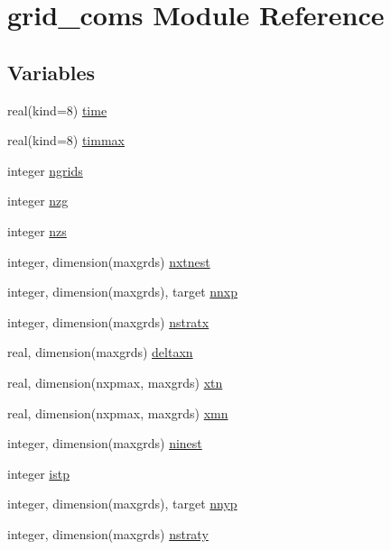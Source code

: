 \hypertarget{namespacegrid__coms}{}\section{grid\+\_\+coms Module Reference}
\label{namespacegrid__coms}
\subsection*{Variables}
\begin{DoxyCompactItemize}
\item 
real(kind=8) \hyperlink{namespacegrid__coms_a620c7c9f9699aec60464ae63865bd8bc}{time}
\item 
real(kind=8) \hyperlink{namespacegrid__coms_a0d5d3c6d496f754a977e81e980b57006}{timmax}
\item 
integer \hyperlink{namespacegrid__coms_ae4989ce85dc7d8d012ce238bcdc5946d}{ngrids}
\item 
integer \hyperlink{namespacegrid__coms_a142d9d74c03f8fa05eda4634bfbe0b83}{nzg}
\item 
integer \hyperlink{namespacegrid__coms_a760d4b670328e4c3a0a7accfdac64c19}{nzs}
\item 
integer, dimension(maxgrds) \hyperlink{namespacegrid__coms_a3a74d4b8ff65bb4d8f8eb2f22a91c68d}{nxtnest}
\item 
integer, dimension(maxgrds), target \hyperlink{namespacegrid__coms_a94ce46153415e535023e58d322bcaa98}{nnxp}
\item 
integer, dimension(maxgrds) \hyperlink{namespacegrid__coms_a319d9e19581f63cae8b605b8c8a6ab85}{nstratx}
\item 
real, dimension(maxgrds) \hyperlink{namespacegrid__coms_a6adc70cd69fe9f3ba2d1f5c8ebb9ab74}{deltaxn}
\item 
real, dimension(nxpmax, maxgrds) \hyperlink{namespacegrid__coms_ac434d86587ed3416352d2ee40a8a542f}{xtn}
\item 
real, dimension(nxpmax, maxgrds) \hyperlink{namespacegrid__coms_aedf16bdd9f6805d93904a372e5f5ac32}{xmn}
\item 
integer, dimension(maxgrds) \hyperlink{namespacegrid__coms_aed0f3b9fcb2b4db297ffcea4d0bb1450}{ninest}
\item 
integer \hyperlink{namespacegrid__coms_abf2dd76ce141fe111aca84a224e4df29}{istp}
\item 
integer, dimension(maxgrds), target \hyperlink{namespacegrid__coms_a5776874c241f87f4651671b401170756}{nnyp}
\item 
integer, dimension(maxgrds) \hyperlink{namespacegrid__coms_a2886e23677c5f71657725bda33ccaba8}{nstraty}

\end{DoxyCompactItemize}
